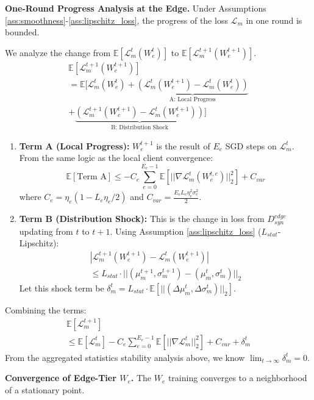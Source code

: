 \noindent\textbf{One-Round Progress Analysis at the Edge.}
Under Assumptions \cref{ass:smoothness}-\cref{ass:lipschitz_loss}, the progress of the loss $\mathcal{L}_m$ in one round is bounded.

We analyze the change from $\mathbb{E}[\mathcal{L}_m^t(W_e^t)]$ to $\mathbb{E}[\mathcal{L}_m^{t+1}(W_e^{t+1})]$.
\begin{multline}
    \mathbb{E}[\mathcal{L}_m^{t+1}(W_e^{t+1})] \\
    = \mathbb{E}[\mathcal{L}_m^t(W_e^t) + \underbrace{(\mathcal{L}_m^t(W_e^{t+1}) - \mathcal{L}_m^t(W_e^t))}_{\text{A: Local Progress}}  \\ 
    + \underbrace{(\mathcal{L}_m^{t+1}(W_e^{t+1}) - \mathcal{L}_m^t(W_e^{t+1}))}_{\text{B: Distribution Shock}}] 
\end{multline} 
\begin{enumerate}
    \item \textbf{Term A (Local Progress):} $W_e^{t+1}$ is the result of $E_e$ SGD steps on $\mathcal{L}_m^t$. From the same logic as the local client convergence:
    $$ \mathbb{E}[\text{Term A}] \le -C_e \sum_{e=0}^{E_e-1} \mathbb{E}[||\nabla \mathcal{L}_m^t(W_e^{t,e})||_2^2] + C_{var} $$
    where $C_e = \eta_e(1 - L_e\eta_e/2)$ and $C_{var} = \frac{E_e L_e \eta_e^2 \sigma_e^2}{2}$.
    
    \item \textbf{Term B (Distribution Shock):} This is the change in loss from $D_{syn}^{edge}$ updating from $t$ to $t+1$. Using Assumption \cref{ass:lipschitz_loss} ($L_{stat}$-Lipschitz):
    \begin{multline}
        |\mathcal{L}_m^{t+1}(W_e^{t+1}) - \mathcal{L}_m^t(W_e^{t+1})| \\
        \le L_{stat} \cdot ||(\mu_m^{t+1}, \sigma_m^{t+1}) - (\mu_m^t, \sigma_m^t)||_2
    \end{multline}
    Let this shock term be $\delta_m^t = L_{stat} \cdot \mathbb{E}[||(\Delta\mu_m^t, \Delta\sigma_m^t)||_2]$.
\end{enumerate}
\noindent Combining the terms:
\begin{multline}
    \mathbb{E}[\mathcal{L}_m^{t+1}] \\
    \le \mathbb{E}[\mathcal{L}_m^t] - C_e \sum_{e=0}^{E_e-1} \mathbb{E}[||\nabla \mathcal{L}_m^t||_2^2] + C_{var} + \delta_m^t 
\end{multline}
From the aggregated statistics stability analysis above, we know $\lim_{t \to \infty} \delta_m^t = 0$.


\noindent\textbf{Convergence of Edge-Tier $W_e$.}
The $W_e$ training converges to a neighborhood of a stationary point.


